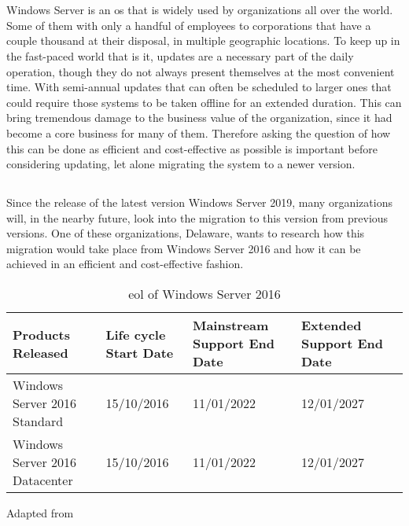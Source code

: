 
\chapter{}
\label{ch:inleiding}

Windows Server is an \acrfull{os} that is widely used by organizations all over the world. Some of them with only a handful of employees to corporations that have a couple thousand at their disposal, in multiple geographic locations. To keep up in the fast-paced world that is \acrfull{it}, updates are a necessary part of the daily operation, though they do not always present themselves at the most convenient time. 
With semi-annual updates that can often be scheduled to larger ones that could require those systems to be taken offline for an extended duration. This can bring tremendous damage to the business value of the organization, since \acrshort{it} had become a core business for many of them. Therefore asking the question of how this can be done as efficient and cost-effective as possible is important before considering updating, let alone migrating the system to a newer version. 


\section{}
\label{sec:probleemstelling}

Since the release of the latest version Windows Server 2019, many organizations will, in the nearby future, look into the migration to this version from previous versions. One of these organizations, Delaware, wants to research how this migration would take place from Windows Server 2016 and how it can be achieved in an efficient and cost-effective fashion. 

\begin{table}[ht]
	\centering
	\begin{adjustbox}{width=1\textwidth}
		\begin{tabular}{l||l|l|l|l}
			Products Released                                                     & Life cycle Start Date & Mainstream Support End Date & Extended Support End Date &\\
			\hline
			\hline
			Windows Server 2016 Standard                                          & 15/10/2016           & 11/01/2022                  & 12/01/2027                &\\
			Windows Server 2016 Datacenter                                        & 15/10/2016			 & 11/01/2022				   & 12/01/2027  			   &\\
		\end{tabular}
	\end{adjustbox}
	\caption{\acrshort{eol} of Windows Server 2016}
	\scriptsize	
	Adapted from \cite{MicrosoftEOL2019}
	\label{tab:EOL2016}
\end{table}

